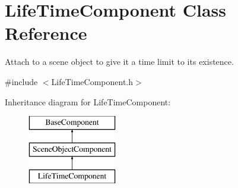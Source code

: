 \hypertarget{class_life_time_component}{}\section{Life\+Time\+Component Class Reference}
\label{class_life_time_component}


Attach to a scene object to give it a time limit to its existence.  




{\ttfamily \#include $<$Life\+Time\+Component.\+h$>$}

Inheritance diagram for Life\+Time\+Component\+:\begin{figure}[H]
\begin{center}
\leavevmode
\includegraphics[height=3.000000cm]{class_life_time_component}
\end{center}
\end{figure}
